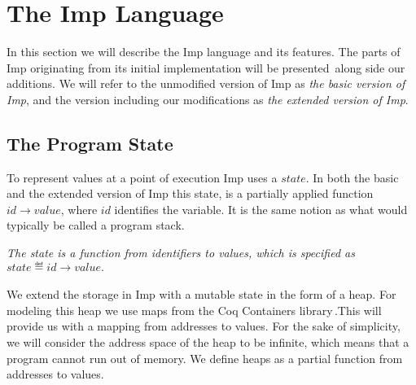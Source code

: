 \section{The Imp Language}
\label{sec:background_imp}
In this section we will describe the Imp language and its features. The parts of Imp originating from its initial implementation will be presented\,\cite{Pierce:SF} along side our additions. We will refer to the unmodified version of Imp as \textit{the basic version of Imp}, and the version including our modifications as \textit{the extended version of Imp}.

\subsection{The Program State}
\label{sec:the_program_state}
To represent values at a point of execution Imp uses a $state$. In both the basic and the extended version of Imp this state, is a partially applied function $id \to value$, where $id$ identifies the variable. It is the same notion as what would typically be called a program stack.

 \textit{The state is a function from identifiers to values, which is specified as }$state \eqdef id \to value.$

\paragraph{}
We extend the storage in Imp with a mutable state in the form of a heap. For modeling this heap we use maps from the Coq Containers library\,\cite{CoqContainers}.This will provide us with a mapping from addresses to values. For the sake of simplicity, we will consider the address space of the heap to be infinite, which means that a program cannot run out of memory. We define heaps as a partial function from addresses to values.


